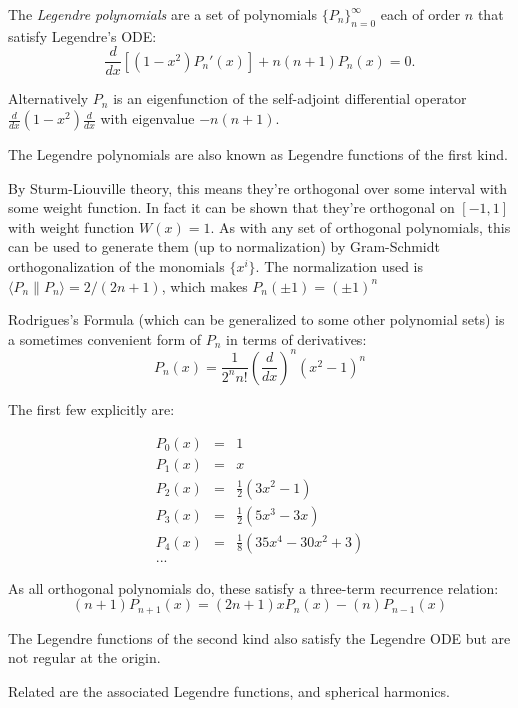 \documentclass{article}
\begin{document}
The \emph{Legendre polynomials} are a set of polynomials $\{P_n\}_{n=0}^{\infty}$ each of order $n$ that satisfy Legendre's ODE: $$\frac{d}{dx}[(1-x^2) P_n'(x)] + n(n+1)P_n(x) = 0.$$

Alternatively $P_n$ is an eigenfunction of the self-adjoint differential operator $\frac{d}{dx}(1-x^2) \frac{d}{dx}$ with eigenvalue $-n(n+1)$.

The Legendre polynomials are also known as Legendre functions of the first kind.

By Sturm-Liouville theory, this means they're orthogonal over some interval with
some weight function.  In fact it can be shown that they're orthogonal on $[-1, 1]$ with weight function $W(x) = 1$.  As with any set of orthogonal polynomials, this can be used to generate them (up to normalization) by Gram-Schmidt orthogonalization of the monomials $\{x^i\}$.  The normalization used
is $\langle P_n \| P_n \rangle = 2 / (2n + 1)$, which makes $P_n(\pm 1) = (\pm 1)^n$

Rodrigues's Formula (which can be generalized to some other polynomial sets) is a sometimes convenient form of $P_n$ in terms of derivatives:
$$P_n(x) = \frac{1}{2^n n!} \left( \frac{d}{dx} \right)^n (x^2 - 1)^n$$

The first few explicitly are: 

\begin{eqnarray*}
P_0(x) &=& 1 \\
P_1(x) &=& x \\
P_2(x) &=& \frac{1}{2} (3x^2 - 1) \\
P_3(x) &=& \frac{1}{2} (5x^3 - 3x) \\
P_4(x) &=& \frac{1}{8} (35x^4 - 30x^2 + 3) \\
...
\end{eqnarray*}

As all orthogonal polynomials do, these satisfy a three-term recurrence relation:
$$(n+1)P_{n+1}(x) = (2n+1)xP_{n}(x) - (n)P_{n-1}(x)$$

The Legendre functions of the second kind also satisfy the Legendre ODE but are not regular at the origin.

Related are the associated Legendre functions, and spherical harmonics.
\end{document}

